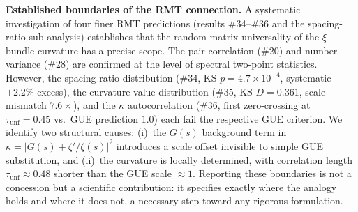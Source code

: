\documentclass[11pt, a4paper]{article}
\theoremstyle{definition}
\theoremstyle{plain}
\begin{document}
\medskip\noindent
\textbf{Established boundaries of the RMT connection.}\;
A systematic investigation of four finer RMT predictions (results
\#34--\#36 and the spacing-ratio sub-analysis) establishes that the
random-matrix universality of the $\xi$-bundle curvature has a precise
scope.  The pair correlation (\#20) and number variance (\#28) are
confirmed at the level of spectral two-point statistics.  However,
the spacing ratio distribution (\#34, KS $p = 4.7 \times 10^{-4}$,
systematic $+2.2\%$ excess), the curvature value distribution
(\#35, KS $D = 0.361$, scale mismatch $7.6\times$), and the
$\kappa$ autocorrelation (\#36, first zero-crossing at
$\tau_\text{unf} = 0.45$ vs.\ GUE prediction $1.0$) each fail the
respective GUE criterion.  We identify two structural causes:
(i)~the $G(s)$ background term in $\kappa = |G(s) + \zeta'/\zeta(s)|^2$
introduces a scale offset invisible to simple GUE substitution, and
(ii)~the curvature is locally determined, with correlation length
$\tau_\text{unf} \approx 0.48$ shorter than the GUE scale $\approx 1$.
Reporting these boundaries is not a concession but a scientific
contribution: it specifies exactly where the analogy holds and where
it does not, a necessary step toward any rigorous formulation.
\end{document}
